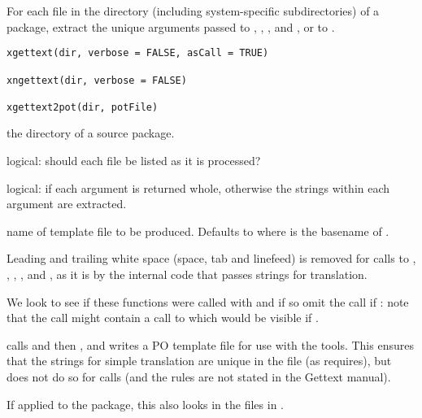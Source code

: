 %
\begin{Description}\relax
For each file in the  directory (including system-specific
subdirectories) of a package, extract the unique arguments passed
to , , ,
 and , or to
.
\end{Description}
%
\begin{Usage}
\begin{verbatim}
xgettext(dir, verbose = FALSE, asCall = TRUE)

xngettext(dir, verbose = FALSE)

xgettext2pot(dir, potFile)
\end{verbatim}
\end{Usage}
%
\begin{Arguments}
\begin{ldescription}
\item[\code{dir}] the directory of a source package.
\item[\code{verbose}] logical: should each file be listed as it is processed?
\item[\code{asCall}] logical: if  each argument is returned whole,
otherwise the strings within each argument are extracted.

\item[\code{potFile}] name of  template file to be produced.
Defaults to  where
 is the basename of .
\end{ldescription}
\end{Arguments}
%
\begin{Details}\relax
Leading and trailing white space (space, tab and linefeed) is removed
for calls to , , ,
, and , as it is by the internal code that
passes strings for translation.

We look to see if these functions were called with 
and if so omit the call if : note that the
call might contain a call to  which would be visible if
.

 calls  and then ,
and writes a PO template file for use with the 
tools.  This ensures that the strings for simple translation are
unique in the file (as  requires), but does not do so
for  calls (and the rules are not stated in the Gettext
manual).

If applied to the  package, this also looks in the 
files in .
\end{Details}
